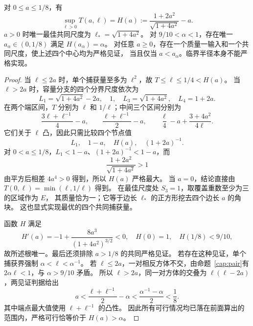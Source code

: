\begin{theorem}[共同尺度的精确临界半径]\label{com:main}
对 $0\le a\le1/8$，有
\[
 \sup_{\ell>0}T(a,\ell)=H(a):=\frac{1+2a^2}{\sqrt{1+4a^2}}-a.
\]
$a>0$ 时唯一最佳共同尺度为 $\ell_*\!=\sqrt{1+4a^2}$。
对 $9/10<\alpha<1$，存在唯一 $a_\alpha\in(0,1/8)$ 满足 $H(a_\alpha)=\alpha$。
对任意 $a\ge0$，存在一个质量一输入和一个共同尺度，使上述四个中心均为严格见证，
当且仅当 $a<a_\alpha$。临界半径本身不能严格实现。
\end{theorem}
\begin{proof}
当 $\ell\le2a$ 时，单个捕获量至多为 $\ell^2$，故 $T\le\ell\le1/4<H(a)$。
当 $\ell>2a$ 时，容量分支的四个分界尺度依次为
\[
 L_1=\sqrt{1+4a^2}-2a,\quad 1,\quad
 L_3=\sqrt{1+4a^2},\quad L_4=1+2a.
\]
在两个端区间，$T$ 分别为 $\ell$ 和 $1/\ell$；中间三个区间分别为
\[
 \frac{3\ell+\ell^{-1}}4-a,\qquad
 \frac{\ell+\ell^{-1}}2-a,\qquad
 \frac{\ell}{4}-a+\frac{3+4a^2}{4\ell}.
\]
它们关于 $\ell$ 凸，因此只需比较四个节点值
\[
 L_1,\quad1-a,\quad H(a),\quad(1+2a)^{-1}.
\]
对 $0<a\le1/8$，$L_1<1-a$、$(1+2a)^{-1}<1-a$，而
\[
 \frac{1+2a^2}{\sqrt{1+4a^2}}>1
\]
由平方后相差 $4a^4>0$ 得到，所以 $H(a)$ 严格最大。
当 $a=0$，结论直接由 $T(0,\ell)=\min(\ell,1/\ell)$ 得到。
在最佳尺度处 $S_3=1$，取覆盖重数至少为三的区域作为 $E$，
其质量恰为一；它等于边长 $\ell_*$ 的正方形挖去四个边长 $a$ 的角块。
这也显式实现最优的四个共同捕获量。

函数 $H$ 满足
\[
 H'(a)=-1+\frac{8a^3}{(1+4a^2)^{3/2}}<0,\quad
 H(0)=1,\quad H(1/8)<9/10,
\]
故所述根唯一。最后还须排除 $a>1/8$ 的共同严格见证。
若存在这种见证，单个捕获界强制 $\alpha<\ell<\alpha^{-1}$。
若 $\ell\le2a$，一对相反方体不交，由命题~\ref{cap:pair}有
$2\alpha\ell<1$，与 $\alpha>9/10$ 矛盾。
所以 $\ell>2a$，同一对方体的交叠为 $\ell(\ell-2a)$，两见证判据给出
\[
 a<\frac{\ell+\ell^{-1}}2-\alpha
 <\frac{\alpha^{-1}-\alpha}{2}<\frac18.
\]
其中端点最大值使用 $\ell+\ell^{-1}$ 的凸性。
因此所有可行情况均已落在前面算出的范围内，严格可行恰等价于 $H(a)>\alpha$。
\end{proof}

